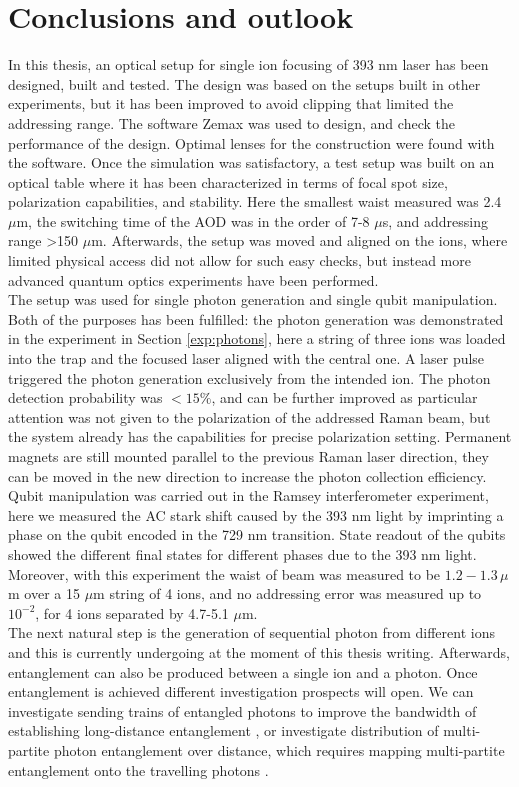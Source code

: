 
\chapter{Conclusions and outlook}
In this thesis, an optical setup for single ion focusing of 393 nm laser has been designed, built and tested. The design was based on the setups built in other experiments, but it has been improved to avoid clipping that limited the addressing range. The software Zemax was used to design, and check the performance of the design. Optimal lenses for the construction were found with the software. Once the simulation was satisfactory, a test setup was built on an optical table where it has been characterized in terms of focal spot size, polarization capabilities, and stability. Here the smallest waist measured was 2.4 $\mu$m, the switching time of the AOD was in the order of 7-8 $\mu$s, and addressing range >150 $\mu$m. Afterwards, the setup was moved and aligned on the ions, where limited physical access did not allow for such easy checks, but instead more advanced quantum optics experiments have been performed.\\
The setup was used for single photon generation and single qubit manipulation. Both of the purposes has been fulfilled: the photon generation was demonstrated in the experiment in Section \ref{exp:photons}, here a string of three ions was loaded into the trap and the focused laser aligned with the central one. A laser pulse triggered the photon generation exclusively from the intended ion. The photon detection probability was $<15\%$, and can be further improved as particular attention was not given to the polarization of the addressed Raman beam, but the system already has the capabilities for precise polarization setting. Permanent magnets are still mounted parallel to the previous Raman laser direction, they can be moved in the new direction to increase the photon collection efficiency.
 Qubit manipulation was carried out in the Ramsey interferometer experiment, here we measured the AC stark shift caused by the 393 nm light by imprinting a phase on the qubit encoded in the 729 nm transition. State readout of the qubits showed the different final states for different phases due to the 393 nm light. Moreover, with this experiment the waist of beam was measured to be $1.2-1.3\,\mu$m over a 15 $\mu$m string of 4 ions, and no addressing error was measured up to $10^{-2}$, for 4 ions separated by 4.7-5.1 $\mu$m.\\
The next natural step is the generation of sequential photon from different ions and this is currently undergoing at the moment of this thesis writing. Afterwards, entanglement can also be produced between a single ion and a photon. Once entanglement is achieved different investigation prospects will open. We can investigate sending trains of entangled photons to improve the bandwidth of establishing long-distance entanglement \cite{Krutyanskiy2019}, or investigate distribution of multi-partite photon entanglement over distance, which requires mapping multi-partite entanglement onto the travelling photons \cite{Arenskotter:19}.
